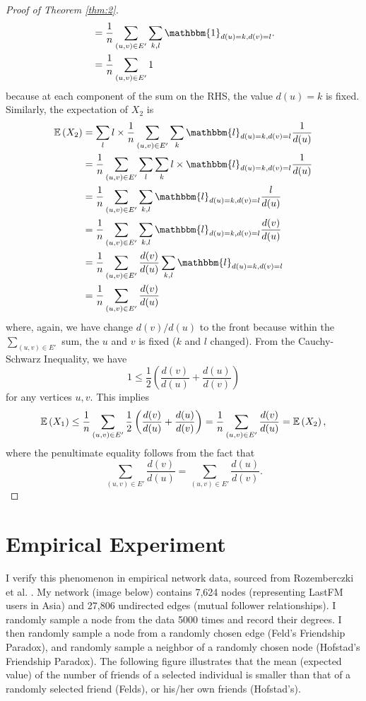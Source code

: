 \documentclass[12pt,reqno, a4]{amsart}
\begin{document}
\begin{proof}[Proof of Theorem \ref{thm:2}]
\begin{align*}
    &= \frac{1}{n} \sum_{(u, v) \in E'} \sum_{k,l} \mathbbm{1}_{d(u) = k, d(v) = l}.\\
    & =  \frac{1}{n} \sum_{(u, v) \in E'} 1
\end{align*}
because at each component of the sum on the RHS, the value $d(u) = k$ is fixed. Similarly, the expectation of $X_2$ is
\begin{align*}
    \E{X_2} & = \sum_l l \times \frac{1}{n} \sum_{(u, v)  \in E'} \sum_{k}\mathbbm{l}_{d(u) = k, d(v) = l} \frac{1}{d(u)}\\
    & =  \frac{1}{n}\sum_{(u, v) \in E'} \sum_l \sum_{k} l \times \mathbbm{l}_{d(u) = k, d(v) = l} \frac{1}{d(u)}\\
    & = \frac{1}{n}\sum_{(u, v) \in E'} \sum_{k, l}\mathbbm{l}_{d(u) = k, d(v) = l} \frac{l}{d(u)}\\ & = \frac{1}{n} \sum_{(u, v) \in E'} \sum_{k,l} \mathbbm{l}_{d(u) = k, d(v) = l} \frac{d(v)}{d(u)} \\ & = \frac{1}{n} \sum_{(u, v) \in E'} \frac{d(v)}{d(u)} \sum_{k,l} \mathbbm{l}_{d(u) = k, d(v) = l}\\
    & = \frac{1}{n} \sum_{(u,v) \in E'} \frac{d(v)}{d(u)}
\end{align*} where, again, we have change $d(v)/d(u)$ to the front because within the $\sum_{(u,v) \in E'}$ sum, the $u$ and $v$ is fixed ($k$ and $l$ changed).
From the Cauchy-Schwarz Inequality, we have \[
1 \leq \frac{1}{2} \left (\frac{d(v)}{d(u)} + \frac{d(u)}{d(v)} \right )
\] for any vertices $u, v$. This implies
\[
\mathbb{E}\left( X_1 \right) \leq \frac{1}{n} \sum_{(u, v) \in E'}\frac{1}{2}\left (\frac{d(v)}{d(u)} + \frac{d(u)}{d(v)} \right ) = \frac{1}{n} \sum_{(u, v) \in E'} \frac{d(v)}{d(u)} = \mathbb{E}\left( X_2 \right),
\]
where the penultimate equality follows from the fact that \[
\sum_{(u, v) \in E'} \frac{d(v)}{d(u)} = \sum_{(u, v) \in E'}\frac{d(u)}{d(v)}.
\]
\end{proof}
\section{Empirical Experiment}
I verify this phenomenon in empirical network data, sourced from Rozemberczki et al. \cite{rozemberczki_characteristic_2020}. My network (image below) contains 7,624 nodes (representing LastFM users in Asia) and 27,806 undirected edges (mutual follower relationships). I randomly sample a node from the data 5000 times and record their degrees. I then  randomly sample a node from a randomly chosen edge (Feld's Friendship Paradox), and randomly sample a neighbor of a randomly chosen node (Hofstad's Friendship Paradox). The following figure illustrates that the mean (expected value) of the number of friends of a selected individual is smaller than that of a randomly selected friend (Felds), or his/her own friends (Hofstad's).
\end{document}
